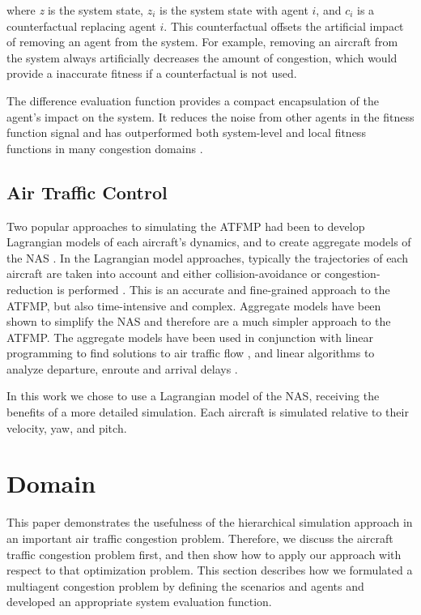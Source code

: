 \documentclass{aamas2014}
\begin{document}
where \textit{z} is the system state, $z_i$ is the system state with agent $i$, and $c_i$ is a counterfactual replacing agent $i$. This counterfactual offsets the artificial impact of removing an agent from the system. For example, removing an aircraft from the system always artificially decreases the amount of congestion, which would provide a inaccurate fitness if a counterfactual is not used.

The difference evaluation function provides a compact encapsulation of the agent's impact on the system. It reduces the noise from other agents in the fitness function signal and has outperformed both system-level and local fitness functions in many congestion domains \cite{AAMAS12-agmon, Colby:2012:SFF:2343576.2343637, tumer-agogino_jaamas12}.

\subsection{Air Traffic Control}

Two popular approaches to simulating the ATFMP had been to develop Lagrangian models of each aircraft's dynamics, and to create aggregate models of the NAS \cite{Bertsimas:1998:ATF:767667.768027, McNally, Mueller_analysisof}. In the Lagrangian model approaches, typically the trajectories of each aircraft are taken into account and either collision-avoidance or congestion-reduction is performed \cite{McNally}. This is an accurate and fine-grained approach to the ATFMP, but also time-intensive and complex. Aggregate models have been shown to simplify the NAS and therefore are a much simpler approach to the ATFMP. The aggregate models have been used in conjunction with linear programming to find solutions to air traffic flow \cite{Bertsimas:1998:ATF:767667.768027}, and linear algorithms to analyze departure, enroute and arrival delays \cite{Mueller_analysisof}.

In this work we chose to use a Lagrangian model of the NAS, receiving the benefits of a more detailed simulation. Each aircraft is simulated relative to their velocity, yaw, and pitch. 

\vspace{10 mm}
\section{Domain}

This paper demonstrates the usefulness of the hierarchical simulation approach in an important air traffic congestion problem. Therefore, we discuss the aircraft traffic congestion problem first, and then show how to apply our approach with respect to that optimization problem. This section describes how we formulated a multiagent congestion problem by defining the scenarios and agents and developed an appropriate system evaluation function.
\end{document}
